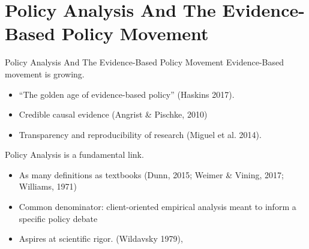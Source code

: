 \documentclass{beamer}
\begin{document}
\section[Evidence Based]{Policy Analysis And The Evidence-Based Policy Movement}

\begin{frame}{Policy Analysis And The Evidence-Based Policy Movement}
Evidence-Based movement is growing. 
\begin{itemize}
\item ``The golden age of evidence-based policy'' (Haskins 2017).
\item Credible causal evidence (Angrist \& Pischke, 2010)
\item Transparency and reproducibility of research (Miguel et al. 2014).
\end{itemize}
\pause
Policy Analysis is a fundamental link. 
\begin{itemize}
\item As many definitions as textbooks (Dunn, 2015; Weimer \& Vining, 2017; Williams, 1971)
\item Common denominator: client-oriented empirical analysis meant to inform a specific policy debate
\item Aspires at scientific rigor. (Wildavsky 1979),
\end{itemize}
\end{frame} 

\end{document}

